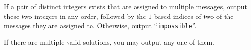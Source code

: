 
    If a pair of distinct integers exists that are assigned to multiple messages,
    output these two integers in any order,
    followed by the $1$-based indices of two of the messages they are assigned to.
    Otherwise, output ``\texttt{impossible}''.

    If there are multiple valid solutions, you may output any one of them.
